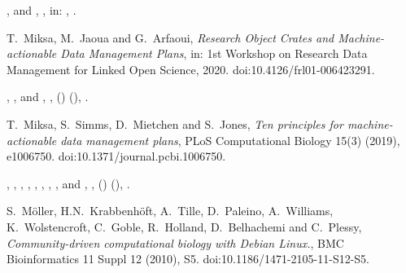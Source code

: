 \documentclass[ds,v1.1.2,openaccess]{iosart2x}%
\begin{document}
\begin{thebibliography}{}
%
\begin{bchapter}
,
 and
,
,
in: ,
.
\end{bchapter}
%
\OrigBibText
T.~Miksa,
M.~Jaoua and
G.~Arfaoui,
\textit{Research Object Crates and Machine-actionable Data Management Plans},
in: 1st Workshop on Research Data Management for Linked Open Science,
2020.
doi:10.4126/frl01-006423291.
\endOrigBibText
{}
\endbibitem

%
\begin{barticle}
,
,
 and
,
,
()
(),
.
\end{barticle}
%
\OrigBibText
T.~Miksa,
S.~Simms,
D.~Mietchen and
S.~Jones,
\textit{Ten principles for machine-actionable data management plans},
{PLoS} Computational Biology
15(3)
(2019),
e1006750.
doi:10.1371/journal.pcbi.1006750.
\endOrigBibText
{}
\endbibitem

%
\begin{barticle}
,
,
,
,
,
,
,
,
 and
,
,
()
(),
.
\end{barticle}
%
\OrigBibText
S.~M\"{o}ller,
H.N.~Krabbenh\"{o}ft,
A.~Tille,
D.~Paleino,
A.~Williams,
K.~Wolstencroft,
C.~Goble,
R.~Holland,
D.~Belhachemi and
C.~Plessy,
\textit{Community-driven computational biology with Debian Linux.},
{BMC} Bioinformatics
11 Suppl 12
(2010),
S5.
doi:10.1186/1471-2105-11-S12-S5.
\endOrigBibText
{}
\endbibitem


\end{thebibliography}
\end{document}
